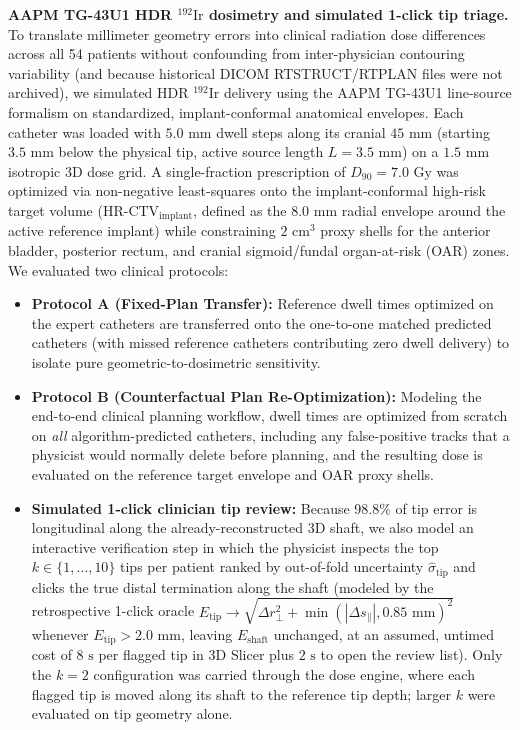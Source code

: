 \documentclass[
  11pt,
]{article}
\providecommand{\tightlist}{%
  \setlength{\itemsep}{0pt}\setlength{\parskip}{0pt}}
\begin{document}
\textbf{AAPM TG-43U1 HDR \(^{192}\text{Ir}\) dosimetry and simulated
1-click tip triage.} To translate millimeter geometry errors into
clinical radiation dose differences across all 54 patients without
confounding from inter-physician contouring variability (and because
historical DICOM RTSTRUCT/RTPLAN files were not archived), we simulated
HDR \(^{192}\text{Ir}\) delivery using the AAPM TG-43U1 line-source
formalism on standardized, implant-conformal anatomical envelopes. Each
catheter was loaded with \(5.0\text{ mm}\) dwell steps along its cranial
\(45\text{ mm}\) (starting \(3.5\text{ mm}\) below the physical tip,
active source length \(L = 3.5\text{ mm}\)) on a \(1.5\text{ mm}\)
isotropic 3D dose grid. A single-fraction prescription of
\(D_{90} = 7.0\text{ Gy}\) was optimized via non-negative least-squares
onto the implant-conformal high-risk target volume
(\(\text{HR-CTV}_{\text{implant}}\), defined as the \(8.0\text{ mm}\)
radial envelope around the active reference implant) while constraining
\(2\text{ cm}^3\) proxy shells for the anterior bladder, posterior
rectum, and cranial sigmoid/fundal organ-at-risk (OAR) zones. We
evaluated two clinical protocols:

\begin{itemize}
\tightlist
\item
  \textbf{Protocol A (Fixed-Plan Transfer):} Reference dwell times
  optimized on the expert catheters are transferred onto the one-to-one
  matched predicted catheters (with missed reference catheters
  contributing zero dwell delivery) to isolate pure
  geometric-to-dosimetric sensitivity.
\item
  \textbf{Protocol B (Counterfactual Plan Re-Optimization):} Modeling
  the end-to-end clinical planning workflow, dwell times are optimized
  from scratch on \emph{all} algorithm-predicted catheters, including
  any false-positive tracks that a physicist would normally delete
  before planning, and the resulting dose is evaluated on the reference
  target envelope and OAR proxy shells.
\item
  \textbf{Simulated 1-click clinician tip review:} Because 98.8\% of tip
  error is longitudinal along the already-reconstructed 3D shaft, we
  also model an interactive verification step in which the physicist
  inspects the top \(k \in \{1, \dots, 10\}\) tips per patient ranked by
  out-of-fold uncertainty \(\hat{\sigma}_{\text{tip}}\) and clicks the
  true distal termination along the shaft (modeled by the retrospective
  1-click oracle
  \(E_{\text{tip}} \to \sqrt{\Delta r_\perp^2 + \min(|\Delta s_\parallel|, 0.85\text{ mm})^2}\)
  whenever \(E_{\text{tip}} > 2.0\text{ mm}\), leaving
  \(E_{\text{shaft}}\) unchanged, at an assumed, untimed cost of
  \(8\text{ s}\) per flagged tip in 3D Slicer plus \(2\text{ s}\) to
  open the review list). Only the \(k = 2\) configuration was carried
  through the dose engine, where each flagged tip is moved along its
  shaft to the reference tip depth; larger \(k\) were evaluated on tip
  geometry alone.
\end{itemize}
\end{document}
